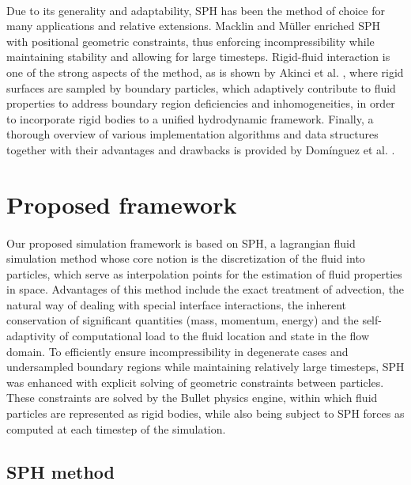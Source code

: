 \documentclass{llncs}
\begin{document}
\paragraph{} Due to its generality and adaptability, SPH has been the method of choice for
many applications and relative extensions. Macklin and M\"{u}ller
\cite{macklin2013position} enriched SPH with positional geometric constraints, thus
enforcing incompressibility while maintaining stability and allowing for large
timesteps. Rigid-fluid interaction is one of the strong aspects of the method, as is shown
by Akinci et al. \cite{akinci2012versatile}, where rigid surfaces are sampled by boundary
particles, which adaptively contribute to fluid properties to address boundary region
deficiencies and inhomogeneities, in order to incorporate rigid bodies to a unified
hydrodynamic framework. Finally, a thorough overview of various implementation algorithms
and data structures together with their advantages and drawbacks is provided by
Dom\'{i}nguez et al. \cite{dominguez2011}.

\section{Proposed framework}

\paragraph{} Our proposed simulation framework is based on SPH, a lagrangian fluid
simulation method whose core notion is the discretization of the fluid into particles,
which serve as interpolation points for the estimation of fluid properties in
space. Advantages of this method include the exact treatment of advection, the natural way
of dealing with special interface interactions, the inherent conservation of significant
quantities (mass, momentum, energy) and the self-adaptivity of computational load to the
fluid location and state in the flow domain. To efficiently ensure incompressibility in
degenerate cases and undersampled boundary regions while maintaining relatively large
timesteps, SPH was enhanced with explicit solving of geometric constraints between
particles. These constraints are solved by the Bullet physics engine, within which fluid
particles are represented as rigid bodies, while also being subject to SPH forces as
computed at each timestep of the simulation.

\subsection{SPH method}
\end{document}
